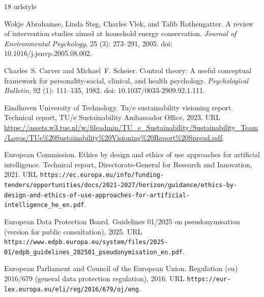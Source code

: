 \documentclass[11pt,a4paper]{article}
\begin{document}

\clearpage
\begin{thebibliography}{18}
\providecommand{\natexlab}[1]{#1}
\providecommand{\url}[1]{\texttt{#1}}
\expandafter\ifx\csname urlstyle\endcsname\relax
  \providecommand{\doi}[1]{doi: #1}\else
  \providecommand{\doi}{doi: \begingroup \urlstyle{rm}\Url}\fi

Wokje Abrahamse, Linda Steg, Charles Vlek, and Talib Rothengatter.
\newblock A review of intervention studies aimed at household energy
  conservation.
\newblock \emph{Journal of Environmental Psychology}, 25 (3):
  273--291, 2005.
\newblock \doi{10.1016/j.jenvp.2005.08.002}.

Charles~S. Carver and Michael~F. Scheier.
\newblock Control theory: A useful conceptual framework for personality-social,
  clinical, and health psychology.
\newblock \emph{Psychological Bulletin}, 92 (1): 111--135,
  1982.
\newblock \doi{10.1037/0033-2909.92.1.111}.

{Eindhoven University of Technology}.
\newblock Tu/e sustainability visioning report.
\newblock Technical report, TU/e Sustainability Ambassador Office, 2023.
\newblock URL
  \url{https://assets.w3.tue.nl/w/fileadmin/TU_e_Sustainability/Sustainability_Team/Logos/TUe%20Sustainability%20Visioning%20Report%20Spread.pdf}.

{European Commission}.
\newblock Ethics by design and ethics of use approaches for artificial
  intelligence.
\newblock Technical report, Directorate-General for Research and Innovation,
  2021.
\newblock URL
  \url{https://ec.europa.eu/info/funding-tenders/opportunities/docs/2021-2027/horizon/guidance/ethics-by-design-and-ethics-of-use-approaches-for-artificial-intelligence_he_en.pdf}.

{European Data Protection Board}.
\newblock Guidelines 01/2025 on pseudonymisation (version for public
  consultation), 2025.
\newblock URL
  \url{https://www.edpb.europa.eu/system/files/2025-01/edpb_guidelines_202501_pseudonymisation_en.pdf}.

{European Parliament and Council of the European Union}.
\newblock Regulation (eu) 2016/679 (general data protection regulation), 2016.
\newblock URL \url{https://eur-lex.europa.eu/eli/reg/2016/679/oj/eng}.


\end{thebibliography}
\end{document}

